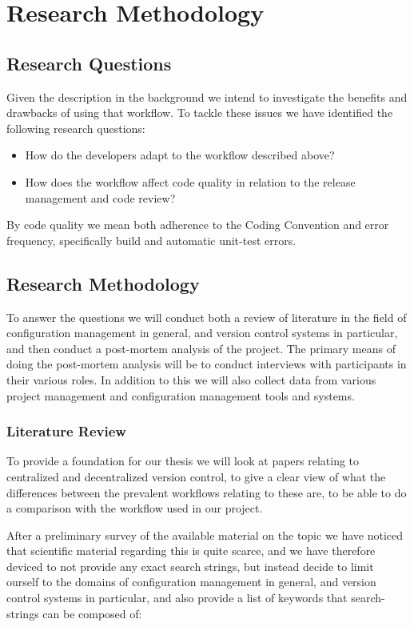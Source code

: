 \documentclass{article}
\begin{document}
\section{Research Methodology}

\subsection{Research Questions}
Given the description in the background we intend to investigate the
benefits and drawbacks of using that workflow. To tackle these issues
we have identified the following research questions:

\begin{itemize}
 \item How do the developers adapt to the workflow described above?
 \item How does the workflow affect code quality in relation to the
       release management and code review?
\end{itemize}

By code quality we mean both adherence to the Coding Convention and
error frequency, specifically build and automatic unit-test errors.

\subsection{Research Methodology}
To answer the questions we will conduct both a review of literature in
the field of configuration management in general, and version control
systems in particular, and then conduct a post-mortem analysis of the
project. The primary means of doing the post-mortem analysis will be
to conduct interviews with participants in their various roles. In
addition to this we will also collect data from various project
management and configuration management tools and systems.

\subsubsection{Literature Review}
\label{sec:litreview}
To provide a foundation for our thesis we will look at papers relating
to centralized and decentralized version control, to give a clear view
of what the differences between the prevalent workflows relating to
these are, to be able to do a comparison with the workflow used in our
project. 

After a preliminary survey of the available material on the topic we
have noticed that scientific material regarding this is quite scarce,
and we have therefore deviced to not provide any exact search strings,
but instead decide to limit ourself to the domains of configuration
management in general, and version control systems in particular, and
also provide a list of keywords that search-strings can be composed
of:
\end{document}
